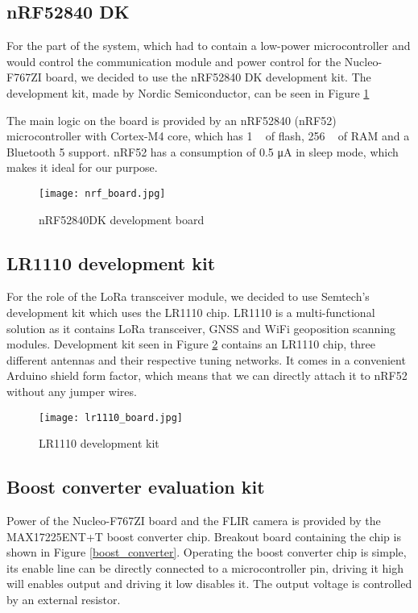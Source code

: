\subsection{ nRF52840 DK}

For the part of the system, which had to contain a low-power microcontroller and would control the communication module and power control for the Nucleo-F767ZI board, we decided to use the nRF52840 DK development kit.
The development kit, made by Nordic Semiconductor, can be seen in Figure \ref{nrf_board}

The main logic on the board is provided by an nRF52840 (nRF52) microcontroller with Cortex-M4 core, which has 1 \si{\mega\byte} of flash, 256 \si{\kilo\byte} of RAM and a Bluetooth 5 support.
nRF52 has a consumption of 0.5 \si{\micro\ampere} in sleep mode, which makes it ideal for our purpose.
\newline
\begin{figure}[ht]
        \centering
        \texttt{[image: nrf\_board.jpg]} 
        \caption{ nRF52840DK development board}
        \label{nrf_board}
\end{figure}

\subsection{ LR1110 development kit}

For the role of the LoRa transceiver module, we decided to use Semtech's development kit which uses the LR1110 chip.
LR1110 is a multi-functional solution as it contains LoRa transceiver, GNSS and WiFi geoposition scanning modules.
Development kit seen in Figure \ref{lr1110_board} contains an LR1110 chip, three different antennas and their respective tuning networks.
It comes in a convenient Arduino shield form factor, which means that we can directly attach it to nRF52 without any jumper wires.
\begin{figure}[ht]
        \centering
        \texttt{[image: lr1110\_board.jpg]} 
        \caption{ LR1110 development kit}
        \label{lr1110_board}
\end{figure}

\subsection{ Boost converter evaluation kit}

Power of the Nucleo-F767ZI board and the FLIR camera is provided by the MAX17225ENT+T boost converter chip.
Breakout board containing the chip is shown in Figure \ref{boost_converter}.
Operating the boost converter chip is simple, its enable line can be directly connected to a microcontroller pin, driving it high will enables output and driving it low disables it.
The output voltage is controlled by an external resistor.


